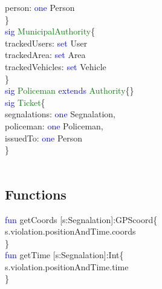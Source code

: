 person: \textcolor{blue}{one} Person\\
\} \\
\textcolor{blue}{sig}
\textcolor{green}{MunicipalAuthority}\{\\
trackedUsers: \textcolor{blue}{set} User\\
trackedArea: \textcolor{blue}{set} Area\\
trackedVehicles: \textcolor{blue}{set} Vehicle\\
\} \\
\textcolor{blue}{sig}
\textcolor{green}{Policeman}
\textcolor{blue}{extends}
\textcolor{green}{Authority}\{\}\\
\textcolor{blue}{sig}
\textcolor{green}{Ticket}\{ \\
segnalations: \textcolor{blue}{one} Segnalation,\\
policeman: \textcolor{blue}{one} Policeman,\\
issuedTo: \textcolor{blue}{one} Person\\
\}\\
\\
\subsection{Functions}
\textcolor{blue}{fun}
\textcolor{mycolor}{getCoords} [s:Segnalation]:GPScoord\{\\
s.violation.positionAndTime.coords\\
\}\\
\textcolor{blue}{fun}
\textcolor{mycolor}{getTime} [s:Segnalation]:Int\{\\
s.violation.positionAndTime.time\\
\}\\
\\
